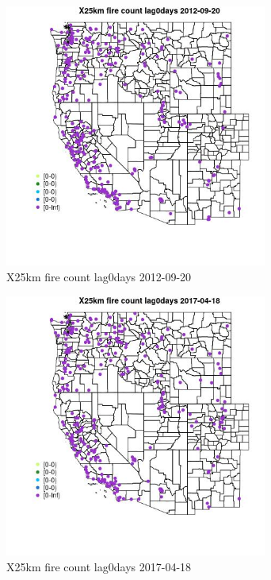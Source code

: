 \begin{figure} 
\centering  
\includegraphics[width=0.77\textwidth]{Code_Outputs/Report_ML_input_PM25_Step4_part_e_de_duplicated_aves_compiled_2019-05-14wNAs_MapObsX25km_fire_count_lag0days2012-09-20.jpg} 
\caption{\label{fig:Report_ML_input_PM25_Step4_part_e_de_duplicated_aves_compiled_2019-05-14wNAsMapObsX25km_fire_count_lag0days2012-09-20}X25km fire count lag0days 2012-09-20} 
\end{figure} 
 

\begin{figure} 
\centering  
\includegraphics[width=0.77\textwidth]{Code_Outputs/Report_ML_input_PM25_Step4_part_e_de_duplicated_aves_compiled_2019-05-14wNAs_MapObsX25km_fire_count_lag0days2017-04-18.jpg} 
\caption{\label{fig:Report_ML_input_PM25_Step4_part_e_de_duplicated_aves_compiled_2019-05-14wNAsMapObsX25km_fire_count_lag0days2017-04-18}X25km fire count lag0days 2017-04-18} 
\end{figure} 
 

